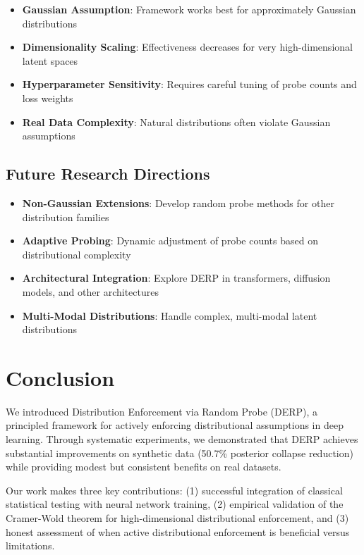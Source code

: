\documentclass{article}
\begin{document}
\begin{itemize}
\item \textbf{Gaussian Assumption}: Framework works best for approximately Gaussian distributions
\item \textbf{Dimensionality Scaling}: Effectiveness decreases for very high-dimensional latent spaces
\item \textbf{Hyperparameter Sensitivity}: Requires careful tuning of probe counts and loss weights
\item \textbf{Real Data Complexity}: Natural distributions often violate Gaussian assumptions
\end{itemize}

\subsection{Future Research Directions}

\begin{itemize}
\item \textbf{Non-Gaussian Extensions}: Develop random probe methods for other distribution families
\item \textbf{Adaptive Probing}: Dynamic adjustment of probe counts based on distributional complexity
\item \textbf{Architectural Integration}: Explore DERP in transformers, diffusion models, and other architectures
\item \textbf{Multi-Modal Distributions}: Handle complex, multi-modal latent distributions
\end{itemize}

\section{Conclusion}

We introduced Distribution Enforcement via Random Probe (DERP), a principled framework for actively enforcing distributional assumptions in deep learning. Through systematic experiments, we demonstrated that DERP achieves substantial improvements on synthetic data (50.7\% posterior collapse reduction) while providing modest but consistent benefits on real datasets.

Our work makes three key contributions: (1) successful integration of classical statistical testing with neural network training, (2) empirical validation of the Cramer-Wold theorem for high-dimensional distributional enforcement, and (3) honest assessment of when active distributional enforcement is beneficial versus limitations.
\end{document}
